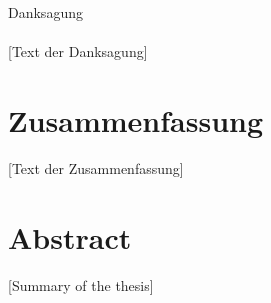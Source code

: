 \documentclass[oneside,bibliography=totocnumbered,BCOR=5mm]{scrbook}%
\theoremstyle{definition}
\theoremstyle{definition}
\theoremstyle{definition}
\theoremstyle{definition}
\theoremstyle{definition}
\theoremstyle{definition}
\begin{document}
\thispagestyle{empty}       %
\vspace*{2.2cm}
\noindent %
{\Huge Danksagung}\\
\vspace*{1.6cm} \\

[Text der Danksagung]

\newpage
\thispagestyle{empty}       %
\section*{Zusammenfassung}
[Text der Zusammenfassung]

\section*{Abstract}
[Summary of the thesis]


\clearpage

\tableofcontents  



 \listoffigures
 

 \listoftables
 


 \lstlistoflistings


\newpage














% 
%  
\end{document}
